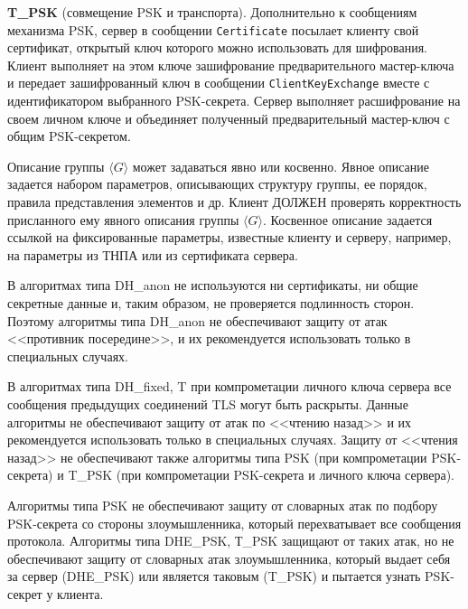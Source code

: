 {\bf T\_PSK} (совмещение PSK и транспорта). Дополнительно к сообщениям 
механизма PSK, сервер в сообщении \lstinline{Certificate} посылает клиенту 
свой сертификат, открытый ключ которого можно использовать для 
шифрования. Клиент выполняет на этом ключе зашифрование предварительного 
мастер-ключа и передает зашифрованный ключ в сообщении 
\lstinline{ClientKeyExchange} вместе с идентификатором выбранного 
PSK-секрета. Сервер выполняет расшифрование на своем личном ключе и 
объединяет полученный предварительный мастер-ключ с общим PSK-секретом. 

\begin{note}
Описание группы $\langle G \rangle$ может задаваться явно или косвенно. Явное
описание задается набором параметров, описывающих структуру группы, ее порядок,
правила представления элементов и др. Клиент ДОЛЖЕН проверять корректность
присланного ему явного описания группы $\langle G \rangle$. Косвенное описание
задается ссылкой на фиксированные параметры, известные клиенту и серверу,
например, на параметры из ТНПА или из сертификата сервера.
\end{note}

\begin{note}
В алгоритмах типа DH\_anon не используются ни 
сертификаты, ни общие секретные данные и, таким образом, не проверяется 
подлинность сторон. Поэтому алгоритмы типа DH\_anon не обеспечивают защиту 
от атак <<противник посередине>>, и их рекомендуется использовать только в 
специальных случаях.
\end{note}

\begin{note}
В алгоритмах типа DH\_fixed, T при компрометации личного ключа сервера все
сообщения предыдущих соединений TLS могут быть раскрыты. Данные алгоритмы не
обеспечивают защиту от атак по <<чтению назад>> и их рекомендуется использовать
только в специальных случаях. Защиту от <<чтения назад>> не обеспечивают также
алгоритмы типа PSK (при компрометации PSK-секрета) и T\_PSK (при компрометации
PSK-секрета и личного ключа сервера).
\end{note}
 
\begin{note}
Алгоритмы типа PSK не обеспечивают защиту от словарных атак по подбору
PSK-секрета со стороны злоумышленника, который перехватывает все сообщения
протокола. Алгоритмы типа DHE\_PSK, Т\_PSK защищают от таких атак, но не
обеспечивают защиту от словарных атак злоумышленника, который выдает себя за
сервер (DHE\_PSK) или является таковым (T\_PSK) и пытается узнать PSK-секрет у
клиента.
\end{note}

